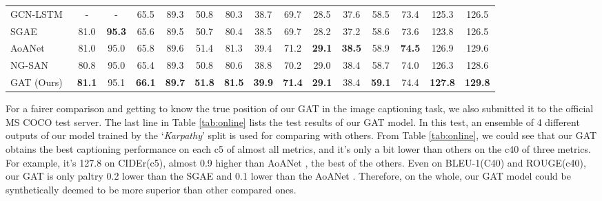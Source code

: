 \documentclass[review]{elsarticle}
\begin{document}
\begin{table*}[htb]
\begin{center}
{\begin{tabular}{l| c c c c c c c c c c c c c c}
        GCN-LSTM~\cite{yao2018exploring}  & -                          & -                          & 65.5                       & 89.3                       & 50.8                       & 80.3                      & 38.7                      & 69.7          & 28.5          & 37.6          & 58.5          & 73.4          & 125.3          & 126.5          \\
        SGAE~\cite{yang2019auto}          & 81.0                       & \textbf{95.3}              & 65.6                       & 89.5                       & 50.7                       & 80.4                      & 38.5                      & 69.7          & 28.2          & 37.2          & 58.6          & 73.6          & 123.8          & 126.5          \\
        AoANet~\cite{huang2019attention}  & 81.0                       & 95.0                       & 65.8                       & 89.6                       & 51.4                       & 81.3                      & 39.4                      & 71.2          & \textbf{29.1} & \textbf{38.5} & 58.9          & \textbf{74.5} & 126.9          & 129.6          \\
        NG-SAN~\cite{guo2020normalized}   & 80.8                       & 95.0                       & 65.4                       & 89.3                       & 50.8                       & 80.6                      & 38.8                      & 70.2          & 29.0          & 38.4          & 58.7          & 74.0          & 126.3          & 128.6          \\
        \hline
        GAT (Ours)                        & \textbf{81.1}              & 95.1                       & \textbf{66.1}              & \textbf{89.7}              & \textbf{51.8}              & \textbf{81.5}             & \textbf{39.9}             & \textbf{71.4} & \textbf{29.1} & 38.4          & \textbf{59.1} & 74.4          & \textbf{127.8} & \textbf{129.8} \\
        \bottomrule
      \end{tabular}}
  \end{center}
\end{table*}


For a fairer comparison and getting to know the true position of our GAT in the image captioning task, we also submitted it to the official MS COCO test server. The last line in Table \ref{tab:online} lists the test results of our GAT model. In this test, an ensemble of 4 different outputs of our model trained by the `\emph{Karpathy}' split is used for comparing with others. From Table \ref{tab:online}, we could see that our GAT obtains the best captioning performance on each c5 of almost all metrics, and it's only a bit lower than others on the c40 of three metrics. For example, it's 127.8 on CIDEr(c5), almost 0.9 higher than  AoANet \cite{huang2019attention}, the best of the others. Even on BLEU-1(C40) and ROUGE(c40), our GAT is only paltry 0.2 lower than the SGAE \cite{yang2019auto} and 0.1 lower than the AoANet \cite{huang2019attention}. Therefore, on the whole, our GAT model could be synthetically deemed to be more superior than other compared ones.
\end{document}
